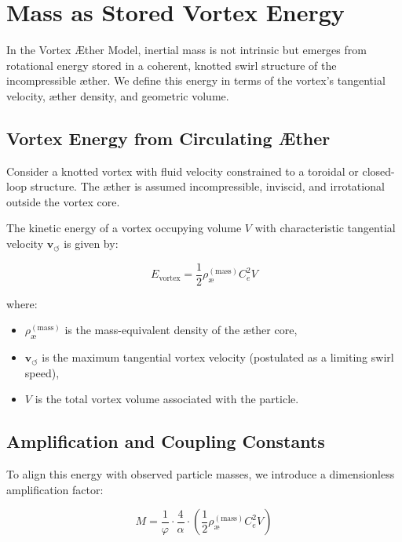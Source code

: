 \documentclass[twocolumn,aps,pre,floatfix,nofootinbib]{revtex4-2}
\begin{document}
\section{Mass as Stored Vortex Energy}

In the Vortex \AE ther Model, inertial mass is not intrinsic but emerges from rotational energy stored in a coherent, knotted swirl structure of the incompressible æther. We define this energy in terms of the vortex's tangential velocity, æther density, and geometric volume.

\subsection{Vortex Energy from Circulating Æther}

Consider a knotted vortex with fluid velocity constrained to a toroidal or closed-loop structure. The æther is assumed incompressible, inviscid, and irrotational outside the vortex core.

The kinetic energy of a vortex occupying volume \( V \) with characteristic tangential velocity \( \mathbf{v}_{\scriptscriptstyle\boldsymbol{\circlearrowleft}} \) is given by:

\begin{equation}
E_{\text{vortex}} = \frac{1}{2} \rho_\text{\ae}^{(\text{mass})} C_e^2 V
\end{equation}

where:
\begin{itemize}
\item \( \rho_\text{\ae}^{(\text{mass})} \) is the mass-equivalent density of the æther core,
\item \( \mathbf{v}_{\scriptscriptstyle\boldsymbol{\circlearrowleft}} \) is the maximum tangential vortex velocity (postulated as a limiting swirl speed),
\item \( V \) is the total vortex volume associated with the particle.
\end{itemize}

\subsection{Amplification and Coupling Constants}

To align this energy with observed particle masses, we introduce a dimensionless amplification factor:

\begin{equation}
M = \frac{1}{\varphi} \cdot \frac{4}{\alpha} \cdot \left( \frac{1}{2} \rho_\text{\ae}^{(\text{mass})} C_e^2 V \right)
\end{equation}
\end{document}
